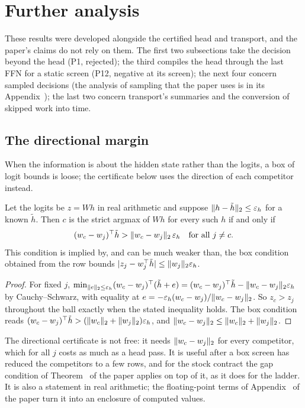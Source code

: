 \section{Further analysis}\label{notes:analysis}
These results were developed alongside the certified head and transport, and the paper's claims do not rely on them. The first two subsections take the decision beyond the head (P1, rejected); the third compiles the head through the last FFN for a static screen (P12, negative at its screen); the next four concern sampled decisions (the analysis of sampling that the paper uses is in its Appendix~); the last two concern transport's summaries and the conversion of skipped work into time.

\subsection{The directional margin}\label{app:directional}
When the information is about the hidden state rather than the logits, a box of logit bounds is loose; the certificate below uses the direction of each competitor instead.
\begin{proposition}\label{prop:directional}
Let the logits be $z=Wh$ in real arithmetic and suppose $\lVert h-\tilde h\rVert_2\le\varepsilon_h$ for a known $\tilde h$. Then $c$ is the strict argmax of $Wh$ for every such $h$ if and only if
\[(w_c-w_j)^\top\tilde h>\lVert w_c-w_j\rVert_2\,\varepsilon_h\quad\text{for all }j\neq c.\]
This condition is implied by, and can be much weaker than, the box condition obtained from the row bounds $|z_j-w_j^\top\tilde h|\le\lVert w_j\rVert_2\varepsilon_h$.
\end{proposition}
\begin{proof}
For fixed $j$, $\min_{\lVert e\rVert_2\le\varepsilon_h}(w_c-w_j)^\top(\tilde h+e)=(w_c-w_j)^\top\tilde h-\lVert w_c-w_j\rVert_2\varepsilon_h$ by Cauchy--Schwarz, with equality at $e=-\varepsilon_h(w_c-w_j)/\lVert w_c-w_j\rVert_2$. So $z_c>z_j$ throughout the ball exactly when the stated inequality holds. The box condition reads $(w_c-w_j)^\top\tilde h>(\lVert w_c\rVert_2+\lVert w_j\rVert_2)\varepsilon_h$, and $\lVert w_c-w_j\rVert_2\le\lVert w_c\rVert_2+\lVert w_j\rVert_2$.
\end{proof}
The directional certificate is not free: it needs $\lVert w_c-w_j\rVert_2$ for every competitor, which for all $j$ costs as much as a head pass. It is useful after a box screen has reduced the competitors to a few rows, and for the stock contract the gap condition of Theorem~ of the paper applies on top of it, as it does for the ladder. It is also a statement in real arithmetic; the floating-point terms of Appendix~ of the paper turn it into an enclosure of computed values.

